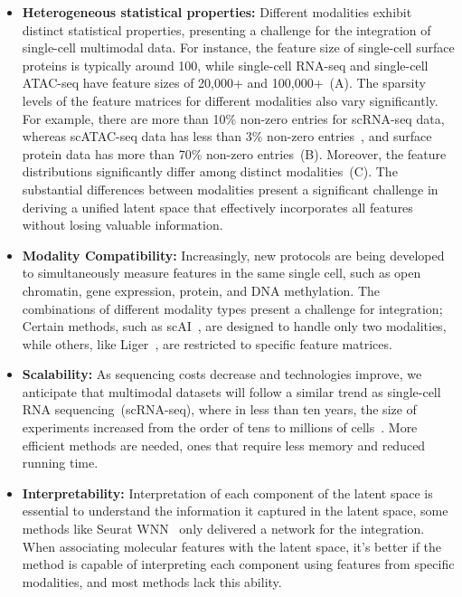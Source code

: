 \begin{itemize}
	\item \textbf{Heterogeneous statistical properties:}
	Different modalities exhibit distinct statistical properties, presenting a challenge for the integration of single-cell multimodal data. For instance, the feature size of single-cell surface proteins is typically around 100, while single-cell RNA-seq and single-cell ATAC-seq have feature sizes of 20,000+ and 100,000+~(A). The sparsity levels of the feature matrices for different modalities also vary significantly. For example, there are more than 10\% non-zero entries for scRNA-seq data, whereas scATAC-seq data has less than 3\% non-zero entries~\citep{li2021chromatin}, and surface protein data has more than 70\% non-zero entries~(B). Moreover, the feature distributions significantly differ among distinct modalities~(C). The substantial differences between modalities present a significant challenge in deriving a unified latent space that effectively incorporates all features without losing valuable information.


	\item \textbf{Modality Compatibility:}
	Increasingly, new protocols are being developed to simultaneously measure features in the same single cell, such as open chromatin, gene expression, protein, and DNA methylation. The combinations of different modality types present a challenge for integration; Certain methods, such as scAI~\citep{jin2020scai}, are designed to handle only two modalities, while others, like Liger~\citep{kriebel2022uinmf}, are restricted to specific feature matrices.

	\item \textbf{Scalability:}
	As sequencing costs decrease and technologies improve, we anticipate that multimodal datasets will follow a similar trend as single-cell RNA sequencing~(scRNA-seq), where in less than ten years, the size of experiments increased from the order of tens to millions of cells~\citep{svensson2018exponential}. More efficient methods are needed, ones that require less memory and reduced running time.

	\item \textbf{Interpretability:}
	Interpretation of each component of the latent space is essential to understand the information it captured in the latent space, some methods like Seurat WNN~\citep{hao2021seurat4} only delivered a network for the integration. When associating molecular features with the latent space, it's better if the method is capable of interpreting each component using features from specific modalities, and most methods lack this ability.


\end{itemize}
